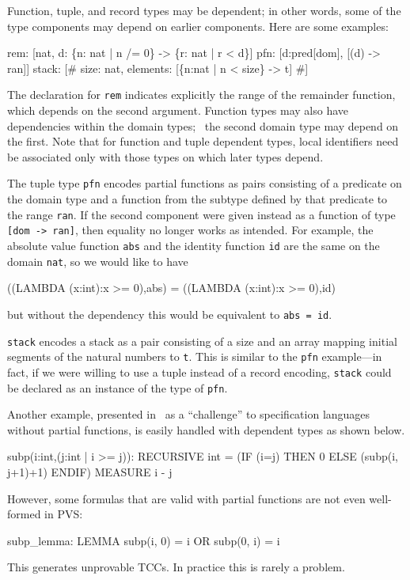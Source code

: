 Function, tuple, and record types may be dependent; in other words, some
of the type components may depend on earlier components.  Here are some
examples:
\begin{pvsex}
  rem: [nat, d: \{n: nat | n /= 0\} -> \{r: nat | r < d\}]
  pfn: [d:pred[dom], [(d) -> ran]]
  stack: [\# size: nat, elements: [\{n:nat | n < size\} -> t] \#]
\end{pvsex}
The declaration for {\tt rem} indicates explicitly the range of the
remainder function, which depends on the second argument.  Function types
may also have dependencies within the domain types; \eg\ the second domain
type may depend on the first.  Note that for function and tuple dependent
types, local identifiers need be associated only with those types on which
later types depend.

The tuple type {\tt pfn} encodes partial functions as pairs consisting
of a predicate on the domain type and a function from the subtype
defined by that predicate to the range {\tt ran}.  If the second
component were given instead as a function of type {\tt [dom -> ran]},
then equality no longer works as intended.  For example, the absolute
value function {\tt abs} and the identity function {\tt id} are the same
on the domain {\tt nat}, so we would like to have
\begin{pvsex}
  ((LAMBDA (x:int):x >= 0),abs) = ((LAMBDA (x:int):x >= 0),id)
\end{pvsex}
%
but without the dependency this would be equivalent to {\tt abs = id}.

{\tt stack} encodes a stack as a pair consisting of a size and an array
mapping initial segments of the natural numbers to {\tt t}.  This is
similar to the {\tt pfn} example---in fact, if we were willing to use a
tuple instead of a record encoding, {\tt stack} could be declared as an
instance of the type of {\tt pfn}.

Another example, presented in~\cite{Cheng&Jones90} as a ``challenge'' to
specification languages without partial functions, is easily handled
with dependent types as shown below.
\begin{pvsex}
  subp(i:int,(j:int | i >= j)): RECURSIVE int =
       (IF (i=j) THEN 0 ELSE (subp(i, j+1)+1) ENDIF)
    MEASURE i - j
\end{pvsex}
However, some formulas that are valid with partial functions are not even
well-formed in PVS:
\begin{pvsex}
  subp_lemma: LEMMA subp(i, 0) = i OR subp(0, i) = i
\end{pvsex}
This generates unprovable TCCs.  In practice this is rarely a problem.


